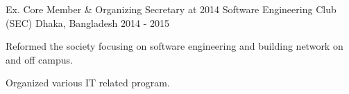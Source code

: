 

\begin{cventries}

  \cventry
    {Ex. Core Member \& Organizing Secretary at 2014} %
    {Software Engineering Club (SEC)} %
    {Dhaka, Bangladesh} %
    {2014 - 2015} %
    {
      \begin{cvitems} %
        \item {Reformed the society focusing on software engineering and building network on and off campus.}
        \item {Organized various IT related program.}
      \end{cvitems}
    }


\end{cventries}
